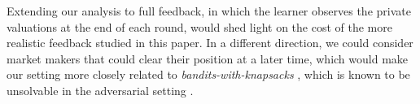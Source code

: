 \documentclass[final,12pt]{colt2025}
\begin{document}
Extending our analysis to full feedback, in which the learner observes the private valuations at the end of each round, would shed light on the cost of the more realistic feedback studied in this paper.
In a different direction, we could consider market makers that could clear their position at a later time, which would make our setting more closely related to \textit{bandits-with-knapsacks} \citep{badanidiyuru_bandits_2018}, which is known to be unsolvable in the adversarial setting \citep{immorlica_adversarial_2023}.
\end{document}
